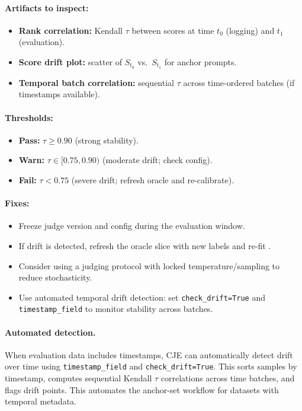 \begin{enumerate}[resume]
\paragraph{Artifacts to inspect:}
\begin{itemize}
\item \textbf{Rank correlation:} Kendall $\tau$ between scores at time $t_0$ (logging) and $t_1$ (evaluation).
\item \textbf{Score drift plot:} scatter of $S_{t_0}$ vs.\ $S_{t_1}$ for anchor prompts.
\item \textbf{Temporal batch correlation:} sequential $\tau$ across time-ordered batches (if timestamps available).
\end{itemize}

\paragraph{Thresholds:}
\begin{itemize}
\item \textbf{Pass:} $\tau \ge 0.90$ (strong stability).
\item \textbf{Warn:} $\tau \in [0.75, 0.90)$ (moderate drift; check config).
\item \textbf{Fail:} $\tau < 0.75$ (severe drift; refresh oracle and re-calibrate).
\end{itemize}

\paragraph{Fixes:}
\begin{itemize}
\item Freeze judge version and config during the evaluation window.
\item If drift is detected, refresh the oracle slice with new labels and re-fit \autocal.
\item Consider using a judging protocol with locked temperature/sampling to reduce stochasticity.
\item Use automated temporal drift detection: set \texttt{check\_drift=True} and \texttt{timestamp\_field} to monitor stability across batches.
\end{itemize}

\paragraph{Automated detection.} When evaluation data includes timestamps, CJE can automatically detect drift over time using \texttt{timestamp\_field} and \texttt{check\_drift=True}. This sorts samples by timestamp, computes sequential Kendall $\tau$ correlations across time batches, and flags drift points. This automates the anchor-set workflow for datasets with temporal metadata.


\end{enumerate}
